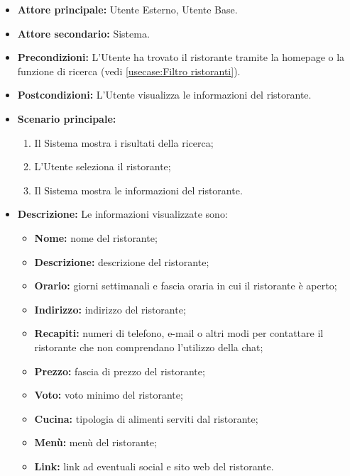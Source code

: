 \label{usecase:Visualizzazione di un ristorante}
\begin{itemize}
	\item \textbf{Attore principale:} Utente Esterno, Utente Base.
	
	\item \textbf{Attore secondario:} Sistema.

	\item \textbf{Precondizioni:} L'Utente ha trovato il ristorante tramite la homepage o la funzione di ricerca (vedi \autoref{usecase:Filtro ristoranti}).

	\item \textbf{Postcondizioni:} L'Utente visualizza le informazioni del ristorante.

	\item \textbf{Scenario principale:}
		\begin{enumerate}
		    \item Il Sistema mostra i risultati della ricerca;
		    \item L'Utente seleziona il ristorante;
		    \item Il Sistema mostra le informazioni del ristorante.
	    \end{enumerate}

	\item \textbf{Descrizione:} Le informazioni visualizzate sono:
	    \begin{itemize}
			\item \textbf{Nome:} nome del ristorante;
			\item \textbf{Descrizione:} descrizione del ristorante;
		    \item \textbf{Orario:} giorni settimanali e fascia oraria in cui il ristorante è aperto;
		    \item \textbf{Indirizzo:} indirizzo del ristorante;
		    \item \textbf{Recapiti:} numeri di telefono, e-mail o altri modi per contattare il ristorante che non comprendano l'utilizzo della chat;
		    \item \textbf{Prezzo:} fascia di prezzo del ristorante;
		    \item \textbf{Voto:} voto minimo del ristorante;
			\item \textbf{Cucina:} tipologia di alimenti serviti dal ristorante;
		    \item \textbf{Menù:} menù del ristorante;
		    \item \textbf{Link:} link ad eventuali social e sito web del ristorante.
	    \end{itemize}
\end{itemize}
